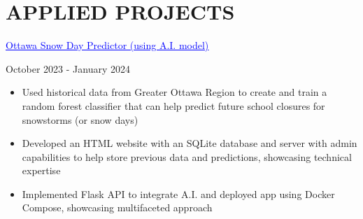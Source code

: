 \documentclass[a4paper,11pt]{article}
\begin{document}
\vspace{2pt}
\section{APPLIED PROJECTS}
\begin{minipage}{.65\linewidth}
    \href{https://github.com/JeremyFriesenGitHub/A.I.-Snow-Day-Predictor}{\textcolor{blue}{\uline{Ottawa Snow Day Predictor (using A.I. model)}}} 
\end{minipage}
\hfill
\begin{minipage}{.34\linewidth}
    \flushright
    October 2023 - January 2024
\end{minipage}
\begin{minipage}{\linewidth}
\vspace{10pt}
\begin{itemize}
    \item Used historical data from Greater Ottawa Region to create and train a random forest classifier that can help predict future school closures for snowstorms (or snow days)
    \item Developed an HTML website with an SQLite database and server with admin capabilities to help store previous data and predictions, showcasing technical expertise
     \item Implemented Flask API to integrate A.I. and deployed app using Docker Compose, showcasing multifaceted approach
  \end{itemize}
\end{minipage}
\end{document}
